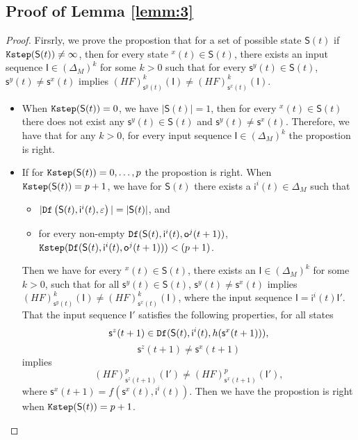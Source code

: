 \begin{appendices}
\subsection{Proof of Lemma \ref{lemm:3}}
\begin{proof} Firsrly, we prove the propostion that for a set of possible state $\mathsf{S}(t)$ if ${\tt Kstep}(\mathsf{S}(t))\ne\infty$, then for every state \State$^{x}(t)\in \mathsf{S}(t)$, there exists an input sequence $\mathsf{I}\in(\Delta_M)^{k}$ for some $k >0$ such that for every $\mathsf{s}^{y}(t)\in \mathsf{S}(t)$, $\mathsf{s}^{y}(t)\neq \mathsf{s}^{x}(t)$ implies $(HF)^{k}_{\mathsf{s}^{y}(t)}(\mathsf{I})\neq (HF)^{k}_{{\mathsf{s}^{x}(t)}}(\mathsf{I})$.
\begin{itemize}
\item When ${\tt Kstep}(\mathsf{S}(t))=0$, we have $|\mathsf{S}(t)|=1$, then for every \State$^{x}(t)$$\in \mathsf{S}(t)$ there does not exist any $\mathsf{s}^{y}(t)\in \mathsf{S}(t)$ and $\mathsf{s}^{y}(t)\neq \mathsf{s}^{x}(t)$. Therefore, we have that for any $k >0$, for every input sequence $\mathsf{I}\in(\Delta_M)^{k}$ the propostion is right. 
\item If for ${\tt Kstep}(\mathsf{S}(t))=0,\ldots, p$ the propostion is right. When ${\tt Kstep}(\mathsf{S}(t))=p+1$, we have for $\mathsf{S}(t)$ there exists a $\mathsf{i}^{i}(t)\in \Delta_M$ such that
 \begin{itemize}
 \item  $|{\tt Df}\left(\mathsf{S}(t),\mathsf{i}^{i}(t),\varepsilon\right)|=|\mathsf{S}(t)|$, and 
 \item  for every non-empty ${\tt Df}(\mathsf{S}(t),\mathsf{i}^{i}(t),\mathsf{o}^{j}(t+1))$, ${\tt Kstep}({\tt Df}(\mathsf{S}(t),\mathsf{i}^{i}(t),\mathsf{o}^{j}(t+1)))<(p+1)$.
 \end{itemize}
 Then we have for every \State$^{x}(t)$$\in \mathsf{S}(t)$, there exists an $\mathsf{I}\in(\Delta_M)^{k}$ for some $k >0$, such that for all $\mathsf{s}^{y}(t)\in \mathsf{S}(t)$, $\mathsf{s}^{y}(t)\neq \mathsf{s}^{x}(t)$ implies $(HF)^{k}_{\mathsf{s}^{y}(t)}(\mathsf{I})\neq (HF)^{k}_{{\mathsf{s}^{x}(t)}}(\mathsf{I})$, where the input sequence $\mathsf{I}=\mathsf{i}^{i}(t)\mathsf{I}'$. That the input sequence $\mathsf{I}'$ satisfies the following properties,
  for all states \[\mathsf{s}^{z}(t+1)\in {\tt Df}(\mathsf{S}(t),\mathsf{i}^{i}(t),h(\mathsf{s}^{x}(t+1))),\]\[\mathsf{s}^{z}(t+1)\neq \mathsf{s}^{x}(t+1)\] implies \[(HF)^p_{\mathsf{s}^{z}(t+1)}(\mathsf{I}')\neq (HF)^p_{{\mathsf{s}^{x}(t+1)}}(\mathsf{I}'),\] where $\mathsf{s}^{x}(t+1)=f(\mathsf{s}^{x}(t),\mathsf{i}^{i}(t))$. Then we have the propostion is right when ${\tt Kstep}(\mathsf{S}(t))=p+1$. 


\end{itemize}
\end{proof}
\end{appendices}
